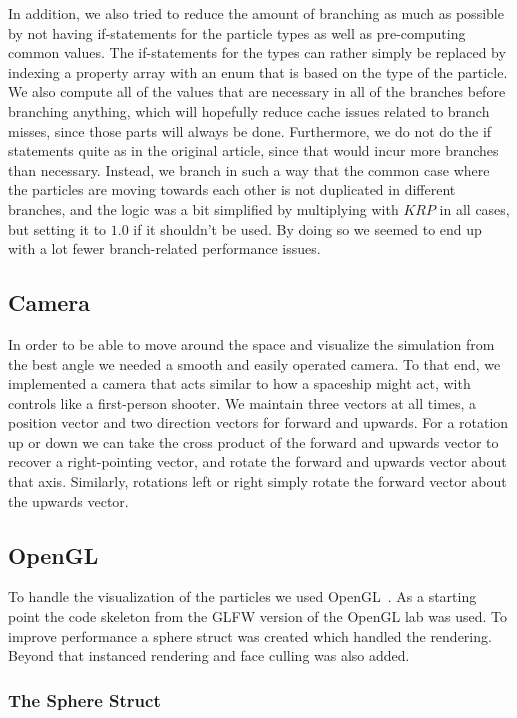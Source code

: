 \documentclass[a4paper]{article}
\begin{document}
In addition, we also tried to reduce the amount of branching as much as possible by not having if-statements for the particle types as well as pre-computing common values.
The if-statements for the types can rather simply be replaced by indexing a property array with an enum that is based on the type of the particle.
We also compute all of the values that are necessary in all of the branches before branching anything, which will hopefully reduce cache issues related to branch misses, since those parts will always be done.
Furthermore, we do not do the if statements quite as in the original article, since that would incur more branches than necessary.
Instead, we branch in such a way that the common case where the particles are moving towards each other is not duplicated in different branches, and the logic was a bit simplified by multiplying with $KRP$ in all cases, but setting it to $1.0$ if it shouldn't be used.
By doing so we seemed to end up with a lot fewer branch-related performance issues.


\subsection{Camera}

In order to be able to move around the space and visualize the simulation from the best angle we needed a smooth and easily operated camera.
To that end, we implemented a camera that acts similar to how a spaceship might act, with controls like a first-person shooter.
We maintain three vectors at all times, a position vector and two direction vectors for forward and upwards.
For a rotation up or down we can take the cross product of the forward and upwards vector to recover a right-pointing vector, and rotate the forward and upwards vector about that axis.
Similarly, rotations left or right simply rotate the forward vector about the upwards vector.

\subsection{OpenGL}

To handle the visualization of the particles we used OpenGL~\cite{opengl}. 
As a starting point the code skeleton from the GLFW version of the OpenGL lab was used. 
To improve performance a sphere struct was created which handled the rendering. 
Beyond that instanced rendering and face culling was also added. 

\subsubsection{The Sphere Struct}
\label{sphere_struct}
\end{document}
